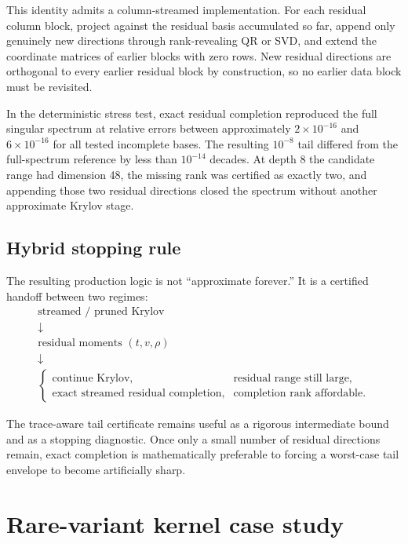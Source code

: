 \documentclass[11pt]{article}
\theoremstyle{definition}
\theoremstyle{remark}
\begin{document}
This identity admits a column-streamed implementation.  For each residual
column block, project against the residual basis accumulated so far, append
only genuinely new directions through rank-revealing QR or SVD, and extend the
coordinate matrices of earlier blocks with zero rows.  New residual directions
are orthogonal to every earlier residual block by construction, so no earlier
data block must be revisited.

In the deterministic stress test, exact residual completion reproduced the
full singular spectrum at relative errors between approximately
\(2\times10^{-16}\) and \(6\times10^{-16}\) for all tested incomplete bases.
The resulting \(10^{-8}\) tail differed from the full-spectrum reference by
less than \(10^{-14}\) decades.  At depth 8 the candidate range had dimension
48, the missing rank was certified as exactly two, and appending those two
residual directions closed the spectrum without another approximate Krylov
stage.

\subsection{Hybrid stopping rule}

The resulting production logic is not ``approximate forever.''  It is a
certified handoff between two regimes:
\[
\boxed{
\begin{array}{c}
\text{streamed / pruned Krylov}\\[2mm]
\downarrow\\[-1mm]
\text{residual moments }(t,v,\rho)\\[2mm]
\downarrow\\[-1mm]
\begin{cases}
\text{continue Krylov}, & \text{residual range still large},\\
\text{exact streamed residual completion}, & \text{completion rank affordable}.
\end{cases}
\end{array}
}
\]

The trace-aware tail certificate remains useful as a rigorous intermediate
bound and as a stopping diagnostic.  Once only a small number of residual
directions remain, exact completion is mathematically preferable to forcing a
worst-case tail envelope to become artificially sharp.

\section{Rare-variant kernel case study}
\end{document}
